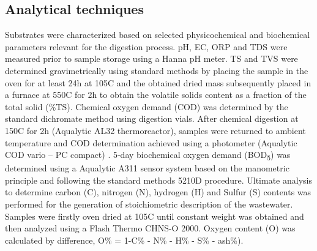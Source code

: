 \subsection{Analytical techniques}
Substrates were characterized based on selected physicochemical and biochemical parameters relevant for the digestion process. pH, EC, ORP and TDS were measured prior to sample storage using a Hanna pH meter. TS and TVS were determined gravimetrically using standard methods by placing the sample in the oven for at least 24h at 105\textdegree C and the obtained dried mass subsequently placed in a furnace at 550\textdegree C for 2h to obtain the volatile solids content as a fraction of the total solid (\%TS). Chemical oxygen demand (COD) was determined by the standard dichromate method using digestion vials. After chemical digestion at 150\textdegree C for 2h (Aqualytic AL32 thermoreactor), samples were returned to ambient temperature and COD determination achieved using a photometer (Aqualytic COD vario – PC compact) \cite{InternationalOrganizationforStandardization2002}. 5‐day biochemical oxygen demand (BOD\textsubscript{5}) was determined using a Aqualytic A311 sensor system based on the manometric principle and following the standard methods 5210D procedure. Ultimate analysis to determine carbon (C), nitrogen (N), hydrogen (H) and Sulfur (S) contents was performed for the generation of stoichiometric description of the wastewater. Samples were firstly oven dried at 105\textdegree C until constant weight was obtained and then analyzed using a Flash Thermo CHNS-O 2000. Oxygen content (O) was calculated by difference, O\% = 1-C\% - N\% - H\% - S\% - ash\%).

